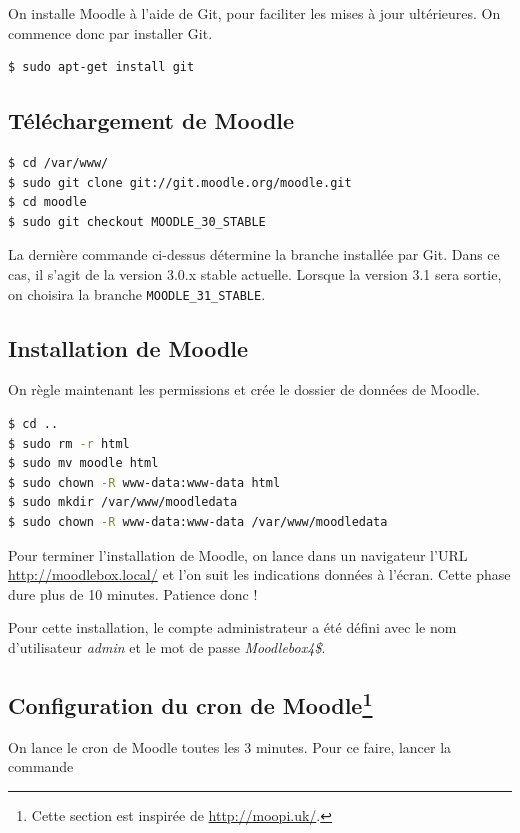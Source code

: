 \documentclass[11pt]{article}
\begin{document}
On installe Moodle à l'aide de Git, pour faciliter les mises à jour ultérieures. On commence donc par installer Git.

\begin{lstlisting}[language=bash]
$ sudo apt-get install git
\end{lstlisting}

\subsection{Téléchargement de Moodle}

\begin{lstlisting}[language=bash]
$ cd /var/www/
$ sudo git clone git://git.moodle.org/moodle.git
$ cd moodle
$ sudo git checkout MOODLE_30_STABLE
\end{lstlisting}
La dernière commande ci-dessus détermine la branche installée par Git. Dans ce cas, il s'agit de la version 3.0.x stable actuelle. Lorsque la version 3.1 sera sortie, on choisira la branche \lstinline{MOODLE_31_STABLE}.

\subsection{Installation de Moodle}

On règle maintenant les permissions et crée le dossier de données de Moodle.
\begin{lstlisting}[language=bash]
$ cd ..
$ sudo rm -r html
$ sudo mv moodle html
$ sudo chown -R www-data:www-data html
$ sudo mkdir /var/www/moodledata
$ sudo chown -R www-data:www-data /var/www/moodledata
\end{lstlisting}

Pour terminer l'installation de Moodle, on lance dans un navigateur l'URL \url{http://moodlebox.local/} et l'on suit les indications données à l'écran. Cette phase dure plus de 10 minutes. Patience donc !

Pour cette installation, le compte administrateur a été défini avec le nom d'utilisateur \emph{admin} et le mot de passe \emph{Moodlebox4\$}.

\subsection[Configuration du cron de Moodle]{Configuration du cron de Moodle\footnote{Cette section est inspirée de \url{http://moopi.uk/}.}}

On lance le cron de Moodle toutes les 3 minutes. Pour ce faire, lancer la commande
\end{document}
